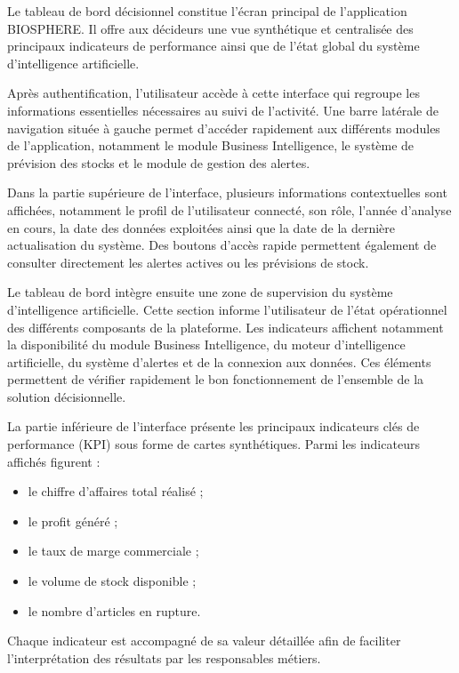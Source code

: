 Le tableau de bord décisionnel constitue l'écran principal de l'application BIOSPHERE. Il offre aux décideurs une vue synthétique et centralisée des principaux indicateurs de performance ainsi que de l'état global du système d'intelligence artificielle.

Après authentification, l'utilisateur accède à cette interface qui regroupe les informations essentielles nécessaires au suivi de l'activité. Une barre latérale de navigation située à gauche permet d'accéder rapidement aux différents modules de l'application, notamment le module Business Intelligence, le système de prévision des stocks et le module de gestion des alertes.

Dans la partie supérieure de l'interface, plusieurs informations contextuelles sont affichées, notamment le profil de l'utilisateur connecté, son rôle, l'année d'analyse en cours, la date des données exploitées ainsi que la date de la dernière actualisation du système. Des boutons d'accès rapide permettent également de consulter directement les alertes actives ou les prévisions de stock.

Le tableau de bord intègre ensuite une zone de supervision du système d'intelligence artificielle. Cette section informe l'utilisateur de l'état opérationnel des différents composants de la plateforme. Les indicateurs affichent notamment la disponibilité du module Business Intelligence, du moteur d'intelligence artificielle, du système d'alertes et de la connexion aux données. Ces éléments permettent de vérifier rapidement le bon fonctionnement de l'ensemble de la solution décisionnelle.

La partie inférieure de l'interface présente les principaux indicateurs clés de performance (KPI) sous forme de cartes synthétiques. Parmi les indicateurs affichés figurent :

\begin{itemize}
    \item le chiffre d'affaires total réalisé ;
    \item le profit généré ;
    \item le taux de marge commerciale ;
    \item le volume de stock disponible ;
    \item le nombre d'articles en rupture.
\end{itemize}

Chaque indicateur est accompagné de sa valeur détaillée afin de faciliter l'interprétation des résultats par les responsables métiers.


